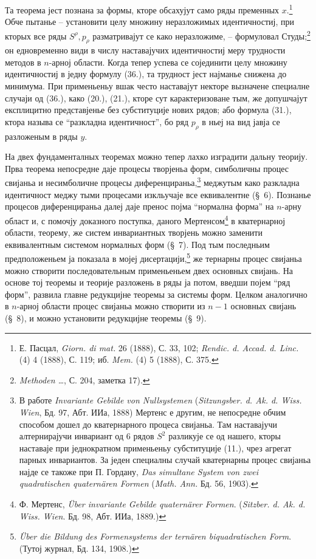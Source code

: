 ﻿\documentclass[11pt]{article}
\begin{document}
Та теорема јест познана за формы, кторе обсахујут само ряды пременных $x$.\footnote{Е. Пасцал, \emph{Giorn. di mat.} 26 (1888), С. 33, 102; \emph{Rendic. d. Accad. d. Linc.} (4) 4 (1888), С. 119; иб. \emph{Mem.} (4) 5 (1888), С. 375.} Обче пытанье -- установити целу множину неразложимых идентичностиј, при кторых все ряды $S^\rho,p_\rho$ разматривајут се како неразложиме, -- формуловал Студы;\footnote{\emph{Methoden \dots}, С. 204, заметка 17).} он едновременно види в числу наставајучих идентичностиј меру трудности методов в $n$-арној области. Когда тепер успева се сојединити целу множину идентичностиј в једну формулу (36.), та трудност јест најманье снижена до минимума. При применьеньу вшак често наставајут некторе вызначене специалне случаји од (36.), како (20.), (21.), кторе сут карактеризоване тым, же допушчајут експлицитно представјенье без субституције нових рядов; або формула (31.), ктора называ се ``разкладна идентичност'', бо ряд $p_\rho$ в ньеј на вид јавја се разложеным в ряды $y$.

На двех фундаменталных теоремах можно тепер лахко изградити дальну теорију. Прва теорема непосредне даје процесы творјеньа форм, симболичны процес свијаньа и несимболичне процесы диференцираньа,\footnote{В работе \emph{Invariante Gebilde von Nullsystemen} (\emph{Sitzungsber. d. Ak. d. Wiss. Wien}, Бд. 97, Абт. ИИа, 1888) Мертенс е другим, не непосредне обчим способом дошел до кватернарного процеса свијаньа. Там наставајучи алтернирајучи инвариант од 6 рядов $S^2$ разликује се од нашего, кторы наставаје при једнократном применьеньу субституције (11.), чрез агрегат парных инвариантов. За једен специалны случай кватернарны процес свијаньа најде се такоже при П. Гордану, \emph{Das simultane System von zwei quadratischen quaternären Formen} (\emph{Math. Ann.} Бд. 56, 1903).} меджутым како разкладна идентичност меджу тыми процесами изкльучаје все еквивалентне (\S\ 6). Познанье процесов диференцираньа далеј даје пренос појма ``нормална форма'' на $n$-арну област и, с помочју доказного поступка, даного Мертенсом\footnote{Ф. Мертенс, \emph{Über invariante Gebilde quaternärer Formen}. (\emph{Sitzber. d. Ak. d. Wiss. Wien}. Бд. 98, Абт. ИИа, 1889.)} в кватернарној области, теорему, же систем инвариантных творјень можно заменити еквивалентным системом нормалных форм (\S\ 7). Под тым последньим предположеньем ја показала в мојеј дисертацији,\footnote{\emph{Über die Bildung des Formensystems der ternären biquadratischen Form}. (Тутој журнал, Бд. 134, 1908.)} же тернарны процес свијаньа можно створити последовательным применьеньем двех основных свијань. На основе тој теоремы и теорије разложень в ряды ја потом, введши појем ``ряд форм'', развила главне редукцијне теоремы за системы форм. Целком аналогично в $n$-арној области процес свијаньа можно створити из $n-1$ основных свијань (\S\ 8), и можно установити редукцијне теоремы (\S\ 9).
\end{document}
